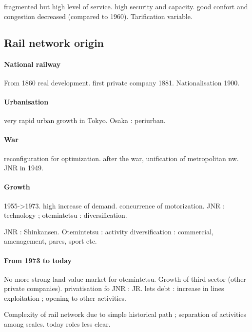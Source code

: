 fragmented but high level of service. high security and capacity. good confort and congestion decreased (compared to 1960). Tarification variable.

\subsection{Rail network origin}

\paragraph{National railway}

From 1860 real development. first private company 1881. Nationalisation 1900.

\paragraph{Urbanisation}

very rapid urban growth in Tokyo. Osaka : periurban.

\paragraph{War}

reconfiguration for optimization. after the war, unification of metropolitan nw. JNR in 1949.

\paragraph{Growth}

1955->1973. high increase of demand. concurrence of motorization. JNR : technology ; otemintetsu : diversification.

JNR : Shinkansen. Otemintetsu : activity diversification : commercial, amenagement, parcs, sport etc.

\paragraph{From 1973 to today}

No more strong land value market for otemintetsu. Growth of third sector (other private companies). privatisation fo JNR : JR. lets debt : increase in lines exploitation ; opening to other activities.

Complexity of rail network due to simple historical path ; separation of activities among scales. today roles less clear.

